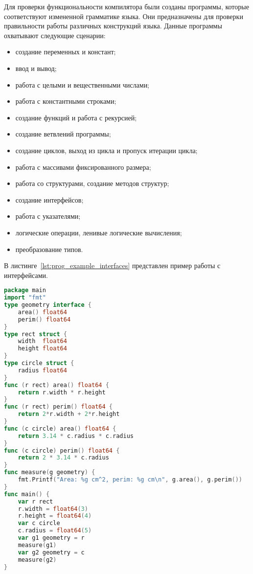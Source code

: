 Для проверки функциональности компилятора были созданы программы, которые соответствуют измененной грамматике языка.
Они предназначены для проверки правильности работы различных конструкций языка.
Данные программы охватывают следующие сценарии:
\begin{itemize}
	\item создание переменных и констант;
	\item ввод и вывод;
	\item работа с целыми и вещественными числами;
	\item работа с константными строками;
	\item создание функций и работа с рекурсией;
	\item создание ветвлений программы;
	\item создание циклов, выход из цикла и пропуск итерации цикла;
	\item работа с массивами фиксированного размера;
	\item работа со структурами, создание методов структур;
	\item создание интерфейсов;
	\item работа с указателями;
	\item логические операции, ленивые логические вычисления;
	\item преобразование типов.
\end{itemize}


В листинге~\ref{lst:prog_example_interfaces} представлен пример работы с интерфейсами.

\begin{lstlisting}[label=lst:prog_example_interfaces,language=go,basicstyle=\scriptsize,numberstyle=\tiny,caption={Пример программы использования интерфейсов}]
package main
import "fmt"
type geometry interface {
	area() float64
	perim() float64
}
type rect struct {
	width  float64
	height float64
}
type circle struct {
	radius float64
}
func (r rect) area() float64 {
	return r.width * r.height
}
func (r rect) perim() float64 {
	return 2*r.width + 2*r.height
}
func (c circle) area() float64 {
	return 3.14 * c.radius * c.radius
}
func (c circle) perim() float64 {
	return 2 * 3.14 * c.radius
}
func measure(g geometry) {
	fmt.Printf("Area: %g cm^2, perim: %g cm\n", g.area(), g.perim())
}
func main() {
	var r rect
	r.width = float64(3)
	r.height = float64(4)
	var c circle
	c.radius = float64(5)
	var g1 geometry = r
	measure(g1)
	var g2 geometry = c
	measure(g2)
}
\end{lstlisting}

